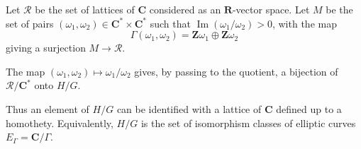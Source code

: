 Let $\mathcal{R}$ be the set of lattices of $\mathbf{C}$ considered as an $\mathbf{R}$-vector space. Let $M$ be the set of pairs $(\omega_1, \omega_2) \in \mathbf{C}^* \times \mathbf{C}^*$ such that $\operatorname{Im}(\omega_1/\omega_2) > 0$, with the map
$$\Gamma(\omega_1, \omega_2) = \mathbf{Z}\omega_1 \oplus \mathbf{Z}\omega_2$$
giving a surjection $M \to \mathcal{R}$.

The map $(\omega_1, \omega_2) \mapsto \omega_1/\omega_2$ gives, by passing to the quotient, a bijection of $\mathcal{R}/\mathbf{C}^*$ onto $H/G$.

Thus an element of $H/G$ can be identified with a lattice of $\mathbf{C}$ defined up to a homothety. Equivalently, $H/G$ is the set of isomorphism classes of elliptic curves $E_\Gamma = \mathbf{C}/\Gamma$.
